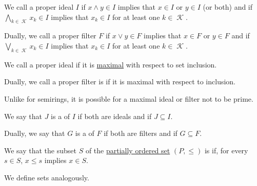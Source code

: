 \begin{definition}
\begin{thmenum}
    \begin{minipage}[t]{0.45\textwidth}
      We call a proper ideal \( I \)  if \( {x \wedge y \in I} \) implies that \( x \in I \) or \( y \in I \) (or both) and  if \( \bigwedge_{k \in \mscrK} x_k \in I \) implies that \( x_k \in I \) for at least one \( k \in \mscrK \).
    \end{minipage}
    \hspace{0.02\textwidth}
    \begin{minipage}[t]{0.45\textwidth}
      Dually, we call a proper filter \( F \)  if \( x \vee y \in F \) implies that \( x \in F \) or \( y \in F \) and  if \( \bigvee_{k \in \mscrK} x_k \in I \) implies that \( x_k \in I \) for at least one \( k \in \mscrK \).
    \end{minipage}

    \begin{minipage}[t]{0.45\textwidth}
      We call a proper ideal  if it is \hyperref[def:extremal_points/maximal_and_minimal_element]{maximal} with respect to set inclusion.
    \end{minipage}
    \hspace{0.02\textwidth}
    \begin{minipage}[t]{0.45\textwidth}
      Dually, we call a proper filter is  if it is maximal with respect to inclusion.

      Unlike for semirings, it is possible for a maximal ideal or filter not to be prime.
    \end{minipage}

    \begin{minipage}[t]{0.45\textwidth}
      We say that \( J \) is a  of \( I \) if both are ideals and if \( J \subseteq I \).
    \end{minipage}
    \hspace{0.02\textwidth}
    \begin{minipage}[t]{0.45\textwidth}
      Dually, we say that \( G \) is a  of \( F \) if both are filters and if \( G \subseteq F \).
    \end{minipage}
  \end{thmenum}
\end{definition}

\begin{definition}\label{def:closed_ordered_subset}
  We say that the subset \( S \) of the \hyperref[def:partially_ordered_set]{partially ordered set} \( (P, \leq) \) is  if, for every \( s \in S \), \( x \leq s \) implies \( x \in S \).

  We define  sets analogously.
\end{definition}

